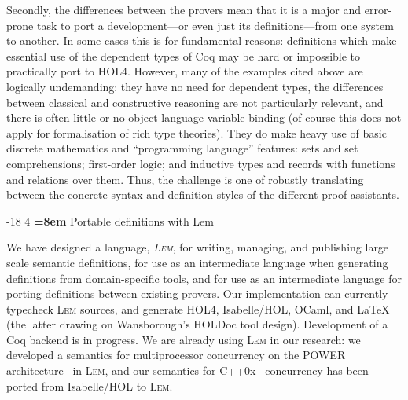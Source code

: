\documentclass[a4paper]{llncs}
\makeatletter
\renewcommand{\section}{\vspace*{-2mm}\@startsection{section}{1}{\z@}%
                       {-18\p@ \@plus -4\p@ \@minus -4\p@}%
                       {4\p@ \@plus 2\p@ \@minus 2\p@}%
                       {\normalfont\large\bfseries\boldmath
                        \rightskip=\z@ \@plus 8em\pretolerance=10000 }}
\newcommand{\toolname}{\textsc{Lem}}
\newcommand{\toolnamesect}{Lem}
\makeatother
\begin{document}
Secondly, the differences between the provers mean that it is a major
and error-prone task to port a development---or even just its
definitions---from one system to another.  In some cases this is for
fundamental reasons:   definitions which make essential use
of the dependent types of Coq may be hard or impossible to practically
port to HOL4.  However, many of the examples cited above are 
logically undemanding: they have no need for dependent types, the
differences between classical and constructive reasoning are not
particularly relevant, and there is often little or no object-language
variable binding (of course this does not apply for formalisation of
rich type theories).   They do make heavy use of basic discrete mathematics and
``programming language'' features: sets and set comprehensions;
first-order logic; and inductive types and records with functions and
relations over them.  Thus, the challenge is one of robustly
translating between the concrete syntax and definition styles of the
different proof assistants. 

\section{Portable definitions with \toolnamesect{}}

%

We have designed a language, \emph{\toolname{}}, for writing,
managing, and publishing large scale semantic definitions, 
for use as an intermediate language when generating definitions
from domain-specific tools, and for use as an
intermediate language for porting definitions between existing provers.
%
  Our
implementation can currently typecheck \toolname{} sources, and
generate HOL4, Isabelle/HOL, OCaml, and \LaTeX{} (the latter drawing
on Wansborough's HOLDoc tool design).
Development of a Coq backend is in progress.  We are already
using \toolname{} in our research: we developed a semantics for
multiprocessor concurrency on the POWER architecture~\cite{pldi11} in \toolname{}, and our semantics
for C++0x~\cite{C++,ppdp11} concurrency has been ported from Isabelle/HOL to \toolname{}.
\end{document}
